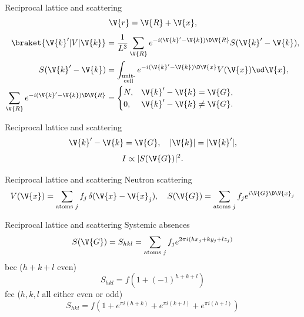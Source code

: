 \documentclass{beamer}
\begin{document}
\begin{frame}{Reciprocal lattice and scattering}
\begin{equation*}
	\V{r} = \V{R} + \V{x},
\end{equation*} 
\begin{align*}
	\braket{\V{k}' | V | \V{k}} &= \frac{1}{L^3} \sum_{\V{R}} e^{-i(\V{k}'-\V{k}) \D\V{R}} S(\V{k}'-\V{k}), \\
	S(\V{k}'-\V{k}) &=  \int_{\substack{\text{unit-} \\\text{cell}}} e^{-i (\V{k}'-\V{k}) \D \V{x}} V(\V{x}) \ud \V{x}, \\
	\sum_{\V{R}} e^{-i (\V{k}'-\V{k}) \D \V{R}} &= \begin{cases}
	N, & \V{k}'-\V{k} = \V{G}, \\
	0, & \V{k}'-\V{k} \neq \V{G}.
	\end{cases}
\end{align*}
\end{frame}

\begin{frame}{Reciprocal lattice and scattering}
\begin{equation*}
	\V{k}'-\V{k} = \V{G}, \quad |\V{k}| = |\V{k}'|,
\end{equation*}
\begin{equation*}
	I \propto |S(\V{G})|^2.
\end{equation*}
\end{frame}

\begin{frame}{Reciprocal lattice and scattering}
Neutron scattering
\begin{equation*}
	V(\V{x}) = \sum_{\text{atoms } j} f_j \, \delta(\V{x}-\V{x}_j), \quad S(\V{G}) = \sum_{\text{atoms } j} f_j e^{i\V{G} \D \V{x}_j}
\end{equation*}
\end{frame}

\begin{frame}{Reciprocal lattice and scattering}
Systemic absences
\begin{equation*}
	S(\V{G}) = S_{hkl} = \sum_{\text{atoms } j} f_j e^{2\pi i(hx_j + ky_j + lz_j)}
\end{equation*}
bcc ($ h+k+l $ even)
\begin{equation*}
	S_{hkl} = f (1+ (-1)^{h+k+l})
\end{equation*}
fcc ($ h,k,l $ all either even or odd)
\begin{equation*}
	S_{hkl} = f (1+ e^{\pi i(h+k)} + e^{\pi i(k+l)} + e^{\pi i(h+l)})
\end{equation*}
\end{frame}
\end{document}
